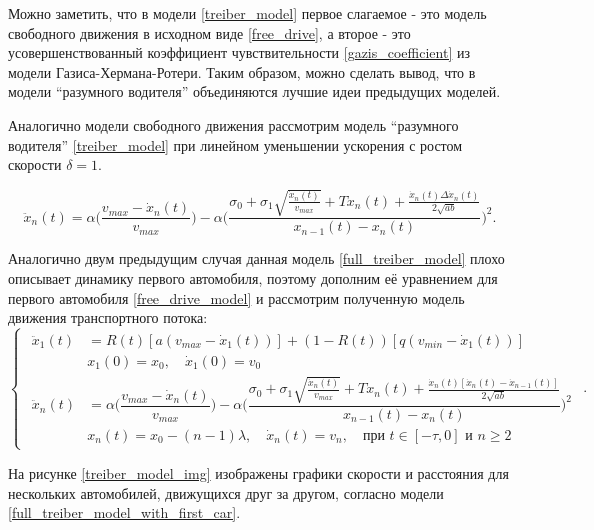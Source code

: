 \documentclass[12pt, a4paper]{extarticle}
\numberwithin{equation}{section}
\numberwithin{figure}{section}
\begin{document}
Можно заметить, что в модели \eqref{treiber_model} первое слагаемое - это модель свободного движения в исходном виде \eqref{free_drive}, а второе - это усовершенствованный коэффициент чувствительности \eqref{gazis_coefficient} из модели Газиса-Хермана-Ротери. Таким образом, можно сделать вывод, что в модели ``разумного водителя'' объединяются лучшие идеи предыдущих моделей.

Аналогично модели свободного движения рассмотрим модель ``разумного водителя'' \eqref{treiber_model} при линейном уменьшении ускорения с ростом скорости $\delta=1$.

\begin{equation} \label{full_treiber_model}
\ddot{x}_n(t)= \alpha\bigg(\dfrac{v_{max}-\dot{x}_n(t)}{v_{max}} \bigg) - \alpha\bigg( \dfrac{\sigma_0+\sigma_1\sqrt{\frac{ \dot{x}_n(t)}{v_{max}}} +T \dot{x}_n(t)+ \frac{ \dot{x}_n(t)\Delta \dot{x}_n(t) }{2\sqrt{ab}}}{x_{n-1}(t)-x_n(t)}\bigg)^2.
\end{equation}

Аналогично двум предыдущим случая данная модель \eqref{full_treiber_model} плохо описывает динамику первого автомобиля, поэтому дополним её уравнением для первого автомобиля \eqref{free_drive_model} и рассмотрим полученную модель движения транспортного потока:
\begin{equation} \label{full_treiber_model_with_first_car} 
\begin{cases}
\begin{split}
\ddot{x}_1(t)& = R(t) \left[ a\left(v_{max}-\dot{x}_1(t) \right)\right] + (1-R(t)) \left[ q\left( v_{min} - \dot{x}_1(t)\right) \right] \\
&x_{1}(0)=x_0, \quad \dot{x}_{1}(0)=v_{0}\\
\ddot{x}_n(t)& = \alpha\bigg(\dfrac{v_{max}-\dot{x}_n(t)}{v_{max}} \bigg) - \alpha\bigg( \dfrac{\sigma_0+\sigma_1\sqrt{\frac{ \dot{x}_n(t)}{v_{max}}} +T \dot{x}_n(t)+ \frac{ \dot{x}_n(t)\left[ \dot{x}_n(t)-\dot{x}_{n-1}(t)\right]  }{2\sqrt{ab}}}{x_{n-1}(t)-x_n(t)}\bigg)^2 \\
&x_n(t)=x_0-(n-1)\lambda, \quad \dot{x}_n(t)=v_{n}, \quad \text{при } t \in [-\tau,0] \text{ и } n\geq2
\end{split}
\end{cases}.
\end{equation}

На рисунке \eqref{treiber_model_img} изображены графики скорости и расстояния для нескольких автомобилей, движущихся друг за другом, согласно модели \eqref{full_treiber_model_with_first_car}.
\end{document}
